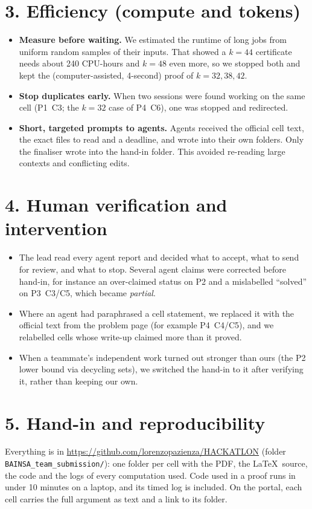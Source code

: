 \documentclass[10pt]{article}
\begin{document}
\section*{3. Efficiency (compute and tokens)}
\begin{itemize}
\item \textbf{Measure before waiting.} We estimated the runtime of long jobs from uniform random samples of their inputs. That showed a $k=44$ certificate needs about 240 CPU-hours and $k=48$ even more, so we stopped both and kept the (computer-assisted, 4-second) proof of $k=32,38,42$.
\item \textbf{Stop duplicates early.} When two sessions were found working on the same cell (P1~C3; the $k=32$ case of P4~C6), one was stopped and redirected.
\item \textbf{Short, targeted prompts to agents.} Agents received the official cell text, the exact files to read and a deadline, and wrote into their own folders. Only the finaliser wrote into the hand-in folder. This avoided re-reading large contexts and conflicting edits.
\end{itemize}

\section*{4. Human verification and intervention}
\begin{itemize}
\item The lead read every agent report and decided what to accept, what to send for review, and what to stop. Several agent claims were corrected before hand-in, for instance an over-claimed status on P2 and a mislabelled ``solved'' on P3~C3/C5, which became \emph{partial}.
\item Where an agent had paraphrased a cell statement, we replaced it with the official text from the problem page (for example P4~C4/C5), and we relabelled cells whose write-up claimed more than it proved.
\item When a teammate's independent work turned out stronger than ours (the P2 lower bound via decycling sets), we switched the hand-in to it after verifying it, rather than keeping our own.
\end{itemize}

\section*{5. Hand-in and reproducibility}
Everything is in \url{https://github.com/lorenzopazienza/HACKATLON} (folder \texttt{BAINSA\_team\_submission/}): one folder per cell with the PDF, the \LaTeX\ source, the code and the logs of every computation used. Code used in a proof runs in under 10 minutes on a laptop, and its timed log is included. On the portal, each cell carries the full argument as text and a link to its folder.
\end{document}
